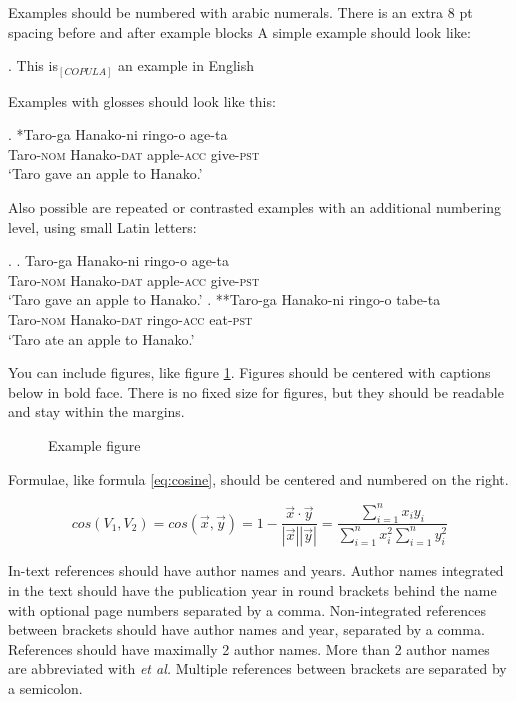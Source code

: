 \documentclass[11pt,a4paper]{article}
\begin{document}
\noindent
Examples should be numbered with arabic numerals. There is an extra 8 pt spacing before and after example blocks  A simple example should look like:

\ex.  This is$_{[COPULA]}$ an example in English 

\noindent
Examples with glosses should look like this:

\exg. *Taro-ga   Hanako-ni   ringo-o    age-ta\\
  Taro-\textsc{nom} Hanako-\textsc{dat}  apple-\textsc{acc} give-\textsc{pst}\\ 
  `Taro gave an apple to Hanako.' 

\noindent
Also possible are repeated or contrasted examples with an additional numbering level, using small Latin letters:


\ex.  
\ag.  Taro-ga   Hanako-ni   ringo-o    age-ta\\
      Taro-\textsc{nom} Hanako-\textsc{dat}  apple-\textsc{acc} 
      give-\textsc{pst}\\
      `Taro gave an apple to Hanako.'
\bg.  **Taro-ga   Hanako-ni   ringo-o    tabe-ta\\
      Taro-\textsc{nom} Hanako-\textsc{dat}  ringo-\textsc{acc} 
      eat-\textsc{pst}\\
      `Taro ate an apple to Hanako.'


\noindent
You can include figures, like figure \ref{fig:varieties}. Figures should be centered with captions below in bold face. There is no fixed size for figures, but they should be readable and stay within the margins. 

\begin{figure}[h]
\centerline{}
{\bf \caption{Example figure} 
\label{fig:varieties}}
\end{figure}

\noindent
Formulae, like formula \ref{eq:cosine}, should be centered and numbered on the right. 

\begin{equation}
cos(V_1,V_2) = cos(\vec{x}, \vec{y}) = 1 - \frac{\vec{x} \cdot \vec{y}}{|\vec{x}| |\vec{y}|} = \frac{\sum_{i=1}^{n} x_i y_i}{\sum_{i=1}^{n} x_i^2 \sum_{i=1}^{n}y_i^2}
\label{eq:cosine}
\end{equation}

\noindent
In-text references should have author names and years. Author names integrated in the text should have the publication year in round brackets behind the name with optional page numbers separated by a comma. Non-integrated references between brackets should have author names and year, separated by a comma. References should have maximally 2 author names. More than 2 author names are abbreviated with {\em et al.} Multiple references between brackets are separated by a semicolon. 
\end{document}
